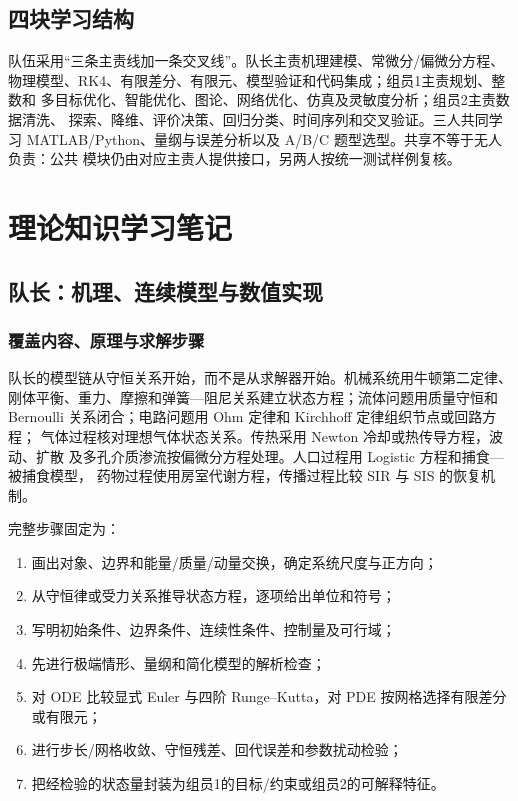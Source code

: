 \documentclass[UTF8,a4paper,12pt]{ctexart}
\begin{document}
\subsection{四块学习结构}

队伍采用“三条主责线加一条交叉线”。队长主责机理建模、常微分/偏微分方程、
物理模型、RK4、有限差分、有限元、模型验证和代码集成；组员1主责规划、整数和
多目标优化、智能优化、图论、网络优化、仿真及灵敏度分析；组员2主责数据清洗、
探索、降维、评价决策、回归分类、时间序列和交叉验证。三人共同学习
MATLAB/Python、量纲与误差分析以及 A/B/C 题型选型。共享不等于无人负责：公共
模块仍由对应主责人提供接口，另两人按统一测试样例复核。

\section{理论知识学习笔记}

\subsection{队长：机理、连续模型与数值实现}

\subsubsection{覆盖内容、原理与求解步骤}

队长的模型链从守恒关系开始，而不是从求解器开始。机械系统用牛顿第二定律、
刚体平衡、重力、摩擦和弹簧—阻尼关系建立状态方程；流体问题用质量守恒和
Bernoulli 关系闭合；电路问题用 Ohm 定律和 Kirchhoff 定律组织节点或回路方程；
气体过程核对理想气体状态关系。传热采用 Newton 冷却或热传导方程，波动、扩散
及多孔介质渗流按偏微分方程处理。人口过程用 Logistic 方程和捕食—被捕食模型，
药物过程使用房室代谢方程，传播过程比较 SIR 与 SIS 的恢复机制。

完整步骤固定为：
\begin{enumerate}
  \item 画出对象、边界和能量/质量/动量交换，确定系统尺度与正方向；
  \item 从守恒律或受力关系推导状态方程，逐项给出单位和符号；
  \item 写明初始条件、边界条件、连续性条件、控制量及可行域；
  \item 先进行极端情形、量纲和简化模型的解析检查；
  \item 对 ODE 比较显式 Euler 与四阶 Runge--Kutta，对 PDE 按网格选择有限差分或有限元；
  \item 进行步长/网格收敛、守恒残差、回代误差和参数扰动检验；
  \item 把经检验的状态量封装为组员1的目标/约束或组员2的可解释特征。
\end{enumerate}
\end{document}
